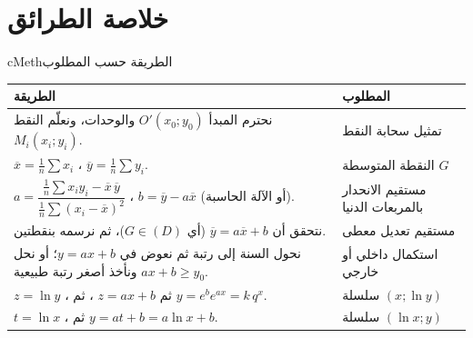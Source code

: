 \documentclass[12pt,a4paper]{article}
\newenvironment{BOX}[2]{\begin{otherlanguage}{english}\begin{arbox}{#1}{#2}}{\end{arbox}\end{otherlanguage}}
\renewcommand{\arraystretch}{1.25}
\begin{document}
\section{خلاصة الطرائق}
\begin{BOX}{cMeth}{الطريقة حسب المطلوب}
\begin{center}
\renewcommand{\arraystretch}{1.35}
\begin{tabular}{|p{}|p{}|}\hline
\rowcolor{cSec!12} \textbf{الطريقة} & \textbf{المطلوب}\\\hline
نحترم المبدأ $O'(x_0;y_0)$ والوحدات، ونعلّم النقط $M_i(x_i;y_i)$. & تمثيل سحابة النقط\\\hline
$\overline{x}=\frac1n\sum x_i$ ، $\overline{y}=\frac1n\sum y_i$. & النقطة المتوسطة $G$\\\hline
$a=\dfrac{\frac1n\sum x_iy_i-\overline{x}\,\overline{y}}{\frac1n\sum(x_i-\overline{x})^2}$ ، $b=\overline{y}-a\overline{x}$ (أو الآلة الحاسبة). & مستقيم الانحدار بالمربعات الدنيا\\\hline
نتحقق أن $\overline{y}=a\overline{x}+b$ (أي $G\in(D)$)، ثم نرسمه بنقطتين. & مستقيم تعديل معطى\\\hline
نحول السنة إلى رتبة ثم نعوض في $y=ax+b$؛ أو نحل $ax+b\ge y_0$ ونأخذ أصغر رتبة طبيعية. & استكمال داخلي أو خارجي\\\hline
$z=\ln y$ ، ثم $z=ax+b$ ، ثم $y=e^{b}e^{ax}=k\,q^{x}$. & سلسلة $(x;\ln y)$\\\hline
$t=\ln x$ ، ثم $y=at+b=a\ln x+b$. & سلسلة $(\ln x;y)$\\\hline
\end{tabular}
\end{center}
\end{BOX}
\end{document}
